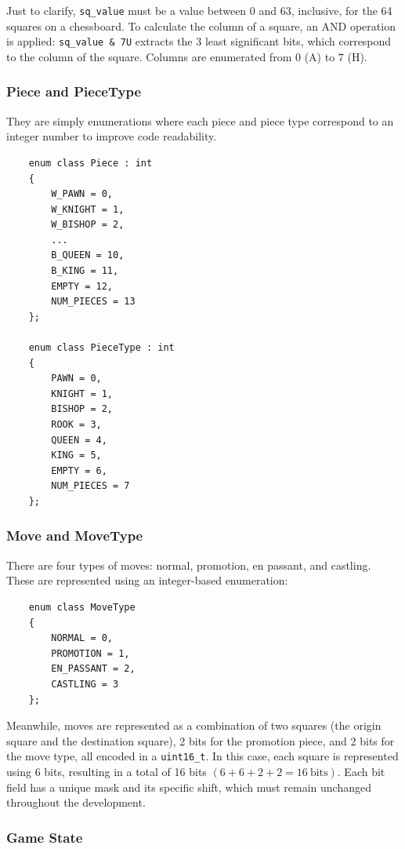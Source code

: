 \noindent Just to clarify, \texttt{sq\_value} must be a value between $0$ and $63$, inclusive, for the 64 squares on a chessboard. To calculate the column of a square, an AND operation is applied: \texttt{sq\_value \& 7U} extracts the 3 least significant bits, which correspond to the column of the square. Columns are enumerated from $0$ (A) to $7$ (H).

\subsubsection{Piece and PieceType}

They are simply enumerations where each piece and piece type correspond to an integer number to improve code readability.

\begin{lstlisting}
    enum class Piece : int
    {
        W_PAWN = 0,
        W_KNIGHT = 1,
        W_BISHOP = 2,
        ...
        B_QUEEN = 10,
        B_KING = 11,
        EMPTY = 12,
        NUM_PIECES = 13
    };

    enum class PieceType : int
    {
        PAWN = 0,
        KNIGHT = 1,
        BISHOP = 2,
        ROOK = 3,
        QUEEN = 4,
        KING = 5,
        EMPTY = 6,
        NUM_PIECES = 7
    };
\end{lstlisting}

\subsubsection{Move and MoveType}

There are four types of moves: normal, promotion, en passant, and castling. These are represented using an integer-based enumeration:

\begin{lstlisting}
    enum class MoveType
    {
        NORMAL = 0,
        PROMOTION = 1,
        EN_PASSANT = 2,
        CASTLING = 3
    };
\end{lstlisting}

\noindent Meanwhile, moves are represented as a combination of two squares (the origin square and the destination square), 2 bits for the promotion piece, and 2 bits for the move type, all encoded in a \texttt{uint16\_t}. In this case, each square is represented using 6 bits, resulting in a total of 16 bits $(6 + 6 + 2 + 2 = 16~\mathrm{bits})$. Each bit field has a unique mask and its specific shift, which must remain unchanged throughout the development.

\subsubsection{Game State}

